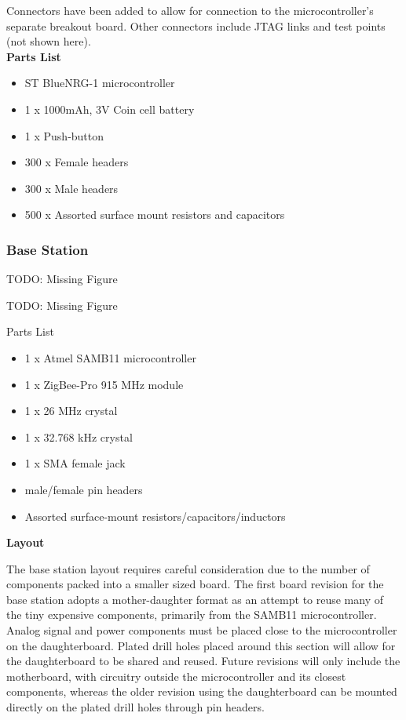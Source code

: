 \documentclass[journal,compsoc]{IEEEtran}
\begin{document}
\noindent Connectors have been added to allow for connection to the microcontroller’s separate breakout board.  Other connectors include JTAG links and test points (not shown here).\\

\noindent \textbf {Parts List}
\begin{itemize}
  \item ST BlueNRG-1 microcontroller
  \item 1 x 1000mAh, 3V Coin cell battery
  \item 1 x Push-button
  \item 300 x Female headers
  \item 300 x Male headers
  \item 500 x Assorted surface mount resistors and capacitors
\end{itemize}

\subsubsection{Base Station}

TODO: Missing Figure

TODO: Missing Figure

Parts List
\begin{itemize}
  \item 1 x Atmel SAMB11 microcontroller
  \item 1 x ZigBee-Pro 915 MHz module
  \item 1 x 26 MHz crystal
  \item 1 x 32.768 kHz crystal
  \item 1 x SMA female jack
  \item male/female pin headers
  \item Assorted surface-mount resistors/capacitors/inductors
\end{itemize}

\noindent \textbf {Layout}

\noindent The base station layout requires careful consideration due to the number of components packed into a smaller sized board.  The first board revision for the base station adopts a mother-daughter format as an attempt to reuse many of the tiny expensive components, primarily from the SAMB11 microcontroller.  Analog signal and power components must be placed close to the microcontroller on the daughterboard.  Plated drill holes placed around this section will allow for the daughterboard to be shared and reused.  Future revisions will only include the motherboard, with circuitry outside the microcontroller and its closest components, whereas the older revision using the daughterboard can be mounted directly on the plated drill holes through pin headers.
\end{document}
